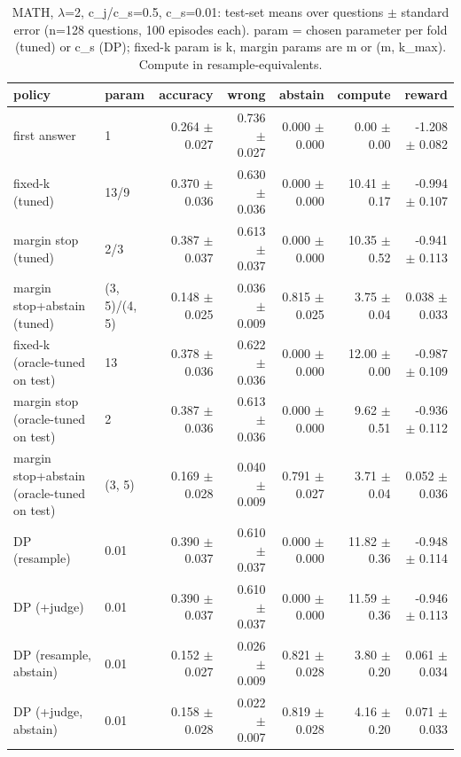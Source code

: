 \begin{table}[t]
\centering
\small
\caption{MATH, $\lambda$=2, c\_j/c\_s=0.5, c\_s=0.01: test-set means over questions $\pm$ standard error (n=128 questions, 100 episodes each). param = chosen parameter per fold (tuned) or c\_s (DP); fixed-k param is k, margin params are m or (m, k\_max). Compute in resample-equivalents.}
\label{tab:headline_math_lam2_jr0.5}
\begin{tabular}{llrrrrr}
\toprule
policy & param & accuracy & wrong & abstain & compute & reward \\
\midrule
first answer & 1 & 0.264 $\pm$ 0.027 & 0.736 $\pm$ 0.027 & 0.000 $\pm$ 0.000 & 0.00 $\pm$ 0.00 & -1.208 $\pm$ 0.082 \\
fixed-k (tuned) & 13/9 & 0.370 $\pm$ 0.036 & 0.630 $\pm$ 0.036 & 0.000 $\pm$ 0.000 & 10.41 $\pm$ 0.17 & -0.994 $\pm$ 0.107 \\
margin stop (tuned) & 2/3 & 0.387 $\pm$ 0.037 & 0.613 $\pm$ 0.037 & 0.000 $\pm$ 0.000 & 10.35 $\pm$ 0.52 & -0.941 $\pm$ 0.113 \\
margin stop+abstain (tuned) & (3, 5)/(4, 5) & 0.148 $\pm$ 0.025 & 0.036 $\pm$ 0.009 & 0.815 $\pm$ 0.025 & 3.75 $\pm$ 0.04 & 0.038 $\pm$ 0.033 \\
fixed-k (oracle-tuned on test) & 13 & 0.378 $\pm$ 0.036 & 0.622 $\pm$ 0.036 & 0.000 $\pm$ 0.000 & 12.00 $\pm$ 0.00 & -0.987 $\pm$ 0.109 \\
margin stop (oracle-tuned on test) & 2 & 0.387 $\pm$ 0.036 & 0.613 $\pm$ 0.036 & 0.000 $\pm$ 0.000 & 9.62 $\pm$ 0.51 & -0.936 $\pm$ 0.112 \\
margin stop+abstain (oracle-tuned on test) & (3, 5) & 0.169 $\pm$ 0.028 & 0.040 $\pm$ 0.009 & 0.791 $\pm$ 0.027 & 3.71 $\pm$ 0.04 & 0.052 $\pm$ 0.036 \\
DP (resample) & 0.01 & 0.390 $\pm$ 0.037 & 0.610 $\pm$ 0.037 & 0.000 $\pm$ 0.000 & 11.82 $\pm$ 0.36 & -0.948 $\pm$ 0.114 \\
DP (+judge) & 0.01 & 0.390 $\pm$ 0.037 & 0.610 $\pm$ 0.037 & 0.000 $\pm$ 0.000 & 11.59 $\pm$ 0.36 & -0.946 $\pm$ 0.113 \\
DP (resample, abstain) & 0.01 & 0.152 $\pm$ 0.027 & 0.026 $\pm$ 0.009 & 0.821 $\pm$ 0.028 & 3.80 $\pm$ 0.20 & 0.061 $\pm$ 0.034 \\
DP (+judge, abstain) & 0.01 & 0.158 $\pm$ 0.028 & 0.022 $\pm$ 0.007 & 0.819 $\pm$ 0.028 & 4.16 $\pm$ 0.20 & 0.071 $\pm$ 0.033 \\
\bottomrule
\end{tabular}
\end{table}
